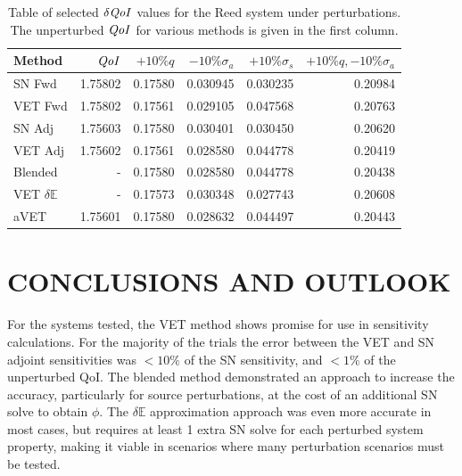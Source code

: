 \documentclass[12pt]{report}
\newcommand{\Edd}{\mathbb{E}}
\newcommand{\sigs}{\sigma_s}
\newcommand{\siga}{\sigma_a}
\newcommand{\qoi}{{\it QoI}\xspace}
\begin{document}
\begin{table}[H]
\centering
  \begin{tabular}{| l | r || r | r | r | r |}
    \hline
    Method  & $\qoi$ & $+10\% q $  & $-10\% \siga $ & $+10\% \sigs $ & $+10\% q,-10\% \siga$ \\ \hline
     SN Fwd 			&1.75802 	&0.17580 &0.030945 &0.030235 & 0.20984\\ \hline
     VET Fwd 			&1.75802 	&0.17561 &0.029105 &0.047568 &0.20763\\ \hline
     SN Adj 			&1.75603  	&0.17580 &0.030401 &0.030450 &0.20620\\ \hline
     VET Adj 			&1.75602  	&0.17561 &0.028580 &0.044778 &0.20419\\ \hline
     Blended 			&-	 		&0.17580 &0.028580 &0.044778 &0.20438\\ \hline
     VET $\delta \Edd$ 	&-		 	&0.17573 &0.030348 &0.027743 &0.20608\\ \hline
     aVET		 		&1.75601 	&0.17580 &0.028632 &0.044497 &0.20443\\ \hline
    \end{tabular}
  \caption{Table of selected $\delta \qoi$ values for the Reed system under perturbations. The unperturbed $\qoi$ for various methods is given in the first column.}
  \label{TableT4}
\end{table}

\chapter{\uppercase {Conclusions and Outlook}} \label{chap:conclusion}

For the systems tested, the VET method shows promise for use in sensitivity calculations. For the majority of the trials the error between the VET and SN adjoint sensitivities was $<10\%$ of the SN sensitivity, and $<1\%$ of the unperturbed QoI. The blended method demonstrated an approach to increase the accuracy, particularly for source perturbations, at the cost of an additional SN solve to obtain $\phi$. The $\delta \Edd$ approximation approach was even more accurate in most cases, but requires at least 1 extra SN solve for each perturbed system property, making it viable in scenarios where many perturbation scenarios must be tested. 
\end{document}
